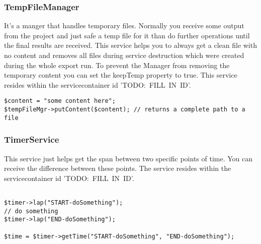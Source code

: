\noindent
\begin{minipage}{\textwidth}
\vspace{1.5em}
\subsubsection{TempFileManager}
It's a manger that handles temporary files. Normally you receive some output from the project and just safe a temp file for it than do further operations until the final results are received. This service helps you to always get a clean file with no content and removes all files during service destruction which were created during the whole export run. To prevent the Manager from removing the temporary content you can set the keepTemp property to true. This service resides within the servicecontainer id \mbox{'TODO: FILL IN ID'}.

\begin{verbatim}
$content = "some content here";
$tempFileMgr->putContent($content); // returns a complete path to a file
\end{verbatim}
\end{minipage}

\noindent
\begin{minipage}{\textwidth}
\vspace{1.5em}
\subsubsection{TimerService}
This service just helps get the span between two specific points of time. You can receive the difference between these points. The service resides within the servicecontainer id \mbox{'TODO: FILL IN ID'}.

\begin{verbatim}

$timer->lap("START-doSomething");
// do something
$timer->lap("END-doSomething");

$time = $timer->getTime("START-doSomething", "END-doSomething");
\end{verbatim}
\end{minipage}

